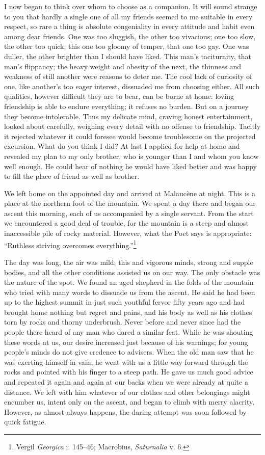 I now began to think over whom to choose as a companion. It will sound
strange to you that hardly a single one of all my friends seemed to me
suitable in every respect, so rare a thing is absolute congeniality in
every attitude and habit even among dear friends. One was too
sluggish, the other too vivacious; one too slow, the other too quick;
this one too gloomy of temper, that one too gay. One was duller, the
other brighter than I should have liked. This man's taciturnity, that
man's flippancy; the heavy weight and obesity of the next, the
thinness and weakness of still another were reasons to deter me. The
cool lack of curiosity of one, like another's too eager interest,
dissuaded me from choosing either. All such qualities, however
difficult they are to bear, can be borne at home: loving friendship is
able to endure everything; it refuses no burden. But on a journey they
become intolerable. Thus my delicate mind, craving honest
entertainment, looked about carefully, weighing every detail with no
offense to friendship. Tacitly it rejected whatever it could foresee
would become troublesome on the projected excursion.  What do
you think I did? At last I applied for help at home and revealed my
plan to my only brother, who is younger than I and whom you know well
enough. He could hear of nothing he would have liked better and was
happy to fill the place of friend as well as brother.

We left home on the appointed day and arrived at Malauc\`{e}ne at
night. This is a place at the northern foot of the mountain. We spent
a day there and began our ascent this morning, each of us accompanied
by a single servant. From the start we encountered a good deal of
trouble, for the mountain is a steep and almost inaccessible pile of
rocky material. However, what the Poet says is appropriate: ``Ruthless
striving overcomes everything.''\footnote{Vergil \textit{Georgica} i.
145--46; Macrobius, \textit{Saturnalia} v. 6.}

The day was long, the air was mild; this and vigorous minds, strong
and supple bodies, and all the other conditions assisted us on our
way. The only obstacle was the nature of the spot. We found an aged
shepherd in the folds of the mountain who tried with many words to
dissuade us from the ascent. He said he had been up to the highest
summit in just such youthful fervor fifty years ago and had brought
home nothing but regret and pains, and his body as well as his clothes
torn by rocks and thorny underbrush. Never before and never since had
the people there heard of any man who dared a similar feat. While he
was shouting these words at us, our desire increased just because of
his warnings; for young people's minds do not give credence to
advisers. When the old man saw that he was exerting himself in vain,
he went with us a little way forward through the rocks and pointed
with his finger to a steep path. He gave us much good advice and
repeated it again and again at our backs when we were already at
quite a distance. We left with him whatever of our clothes and other
belongings might encumber us, intent only on the ascent, and began to
climb with merry alacrity. However, as almost always happens, the
daring attempt was soon followed by quick fatigue.

